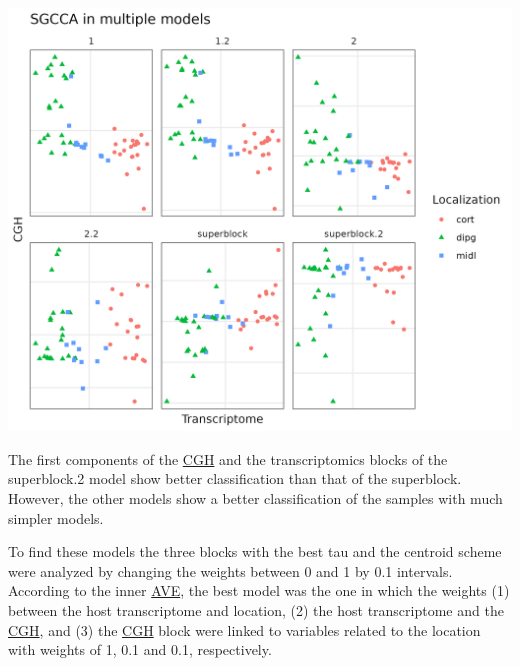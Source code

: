 \documentclass[
  12pt,
  a4paper,
  twoside,
  openright]{book}
\let\origfigure\figure
\let\endorigfigure\endfigure
\renewenvironment{figure}[1][2] {
    \expandafter\origfigure\expandafter[!htbp]
} {
    \endorigfigure
}
\begin{document}
\begin{figure}
\includegraphics[width=1\linewidth]{images/pugets_models} \caption[Different RGCCA models in the Puget dataset.]{Different RGCCA models in the Puget dataset. The different models with the same data showing the sample position on the first components of the CGH  and the transcriptome (or GE) block. Model 1 and 1.2 with transcriptomics, CGH data and all the data about the samples together. Model 2 and 2.2 with transcriptomics, CGH data and all the data about the samples on different blocks. Model superblock and superblock.2 have all the data from different blokcs and one block with all the data. All of them separate the samples according according to the transcriptome component by the localization of the tumors.}\label{fig:puget-models}
\end{figure}

The first components of the \protect\hyperlink{acronyms_CGH}{CGH} and the transcriptomics blocks of the superblock.2 model show better classification than that of the superblock.
However, the other models show a better classification of the samples with much simpler models.

To find these models the three blocks with the best tau and the centroid scheme were analyzed by changing the weights between 0 and 1 by 0.1 intervals.
According to the inner \protect\hyperlink{acronyms_AVE}{AVE}, the best model was the one in which the weights (1) between the host transcriptome and location, (2) the host transcriptome and the \protect\hyperlink{acronyms_CGH}{CGH}, and (3) the \protect\hyperlink{acronyms_CGH}{CGH} block were linked to variables related to the location with weights of 1, 0.1 and 0.1, respectively.
\end{document}
